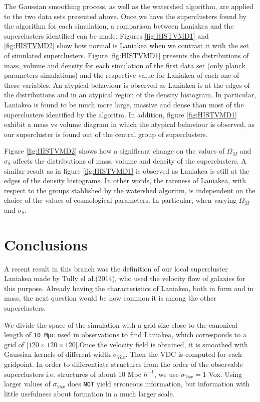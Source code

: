 \documentclass[usenatbib]{mnras}
\begin{document}
The Gaussian smoothing process, as well as the watershed algorithm,
are applied to the two data sets presented above.  Once we have the
superclusters found by the algorithm for each simulation, a comparison
between Laniakea and the superclusters identified can be made. Figures
\ref{fig:HISTVMD1} and \ref{fig:HISTVMD2} show how normal is Laniakea
when we contrast it with the set of simulated superclusters.  
Figure \ref{fig:HISTVMD1} presents the distributions of mass, volume
and density for each simulation of the first data set (only planck
parameters simulations) and the respective value for Laniakea of each
one of these variables. An atypical behaviour is observed as Laniakea
is at the edges of the distributions and in an atypical region of the
density histogram. In particular, Laniakea is found to be much more
large, massive and dense than most of the superclusters identified by
the algoritm. In addition, figure \ref{fig:HISTVMD1} exhibit a mass vs
volume diagram in which the atypical behaviour is observed, as our
supercluster is found out of the central group of superclusters. 

Figure \ref{fig:HISTVMD2} shows how a significant change on the values
of $\Omega_M$ and $\sigma_8$ affects the distributions of mass, volume
and density of the superclusters. A similar result as in figure
\ref{fig:HISTVMD1} is observed as Laniakea is still at the edges of
the density histograms. In other words, the rareness of Laniakea, with
respect to the groups stablished by the watershed algoritm, is
independent on the choice of the values of cosmological parameters. In
particular, when varying $\Omega_M$ and $\sigma_8$. 





\section{Conclusions}
\label{sec:conclusions}

A recent result in this branch was the definition of our local supercluster Laniakea made by Tully el al.(2014)\cite{tully_laniakea_2014}, who used the velocity flow of galaxies for this purpose. Already having the characteristics of Laniakea, both in form and in mass, the next question would be how common it is among the other superclusters.

We divide the space of the simulation with a grid size close to the canonical length of \texttt{10 Mpc} used in observations to find Laniakea, which corresponds to a grid of [$120 \times 120 \times 120$].Once the velocity field is obtained, it is smoothed with Gaussian kernels of different width $\sigma_{Vox}$. Then the VDC is computed for each gridpoint. In order to differentiate structures from the order of the observable superclusters i.e. structures of about 10 Mpc $h^{-1}$, we use $\sigma_{Vox} = 1$ Vox. Using larger values of $\sigma_{Vox}$ does \texttt{NOT} yield erroneous information, but information with little usefulness about formation in a much larger scale.  
\end{document}
